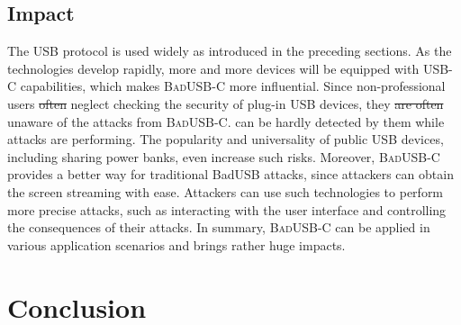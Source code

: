 \documentclass[conference]{IEEEtran}
\newcommand{\tool}{\mbox{\textsc{BadUSB-C}}\xspace}
\newcommand{\outline}[1]{}
\newcommand{\shuqing}[1]{}
\providecommand{\DIFaddtex}[1]{{\protect\color{blue}\uwave{#1}}} %
\providecommand{\DIFdeltex}[1]{{\protect\color{red}\sout{#1}}}                      %
\providecommand{\DIFaddbegin}{} %
\providecommand{\DIFaddend}{} %
\providecommand{\DIFdelbegin}{} %
\providecommand{\DIFdelend}{} %
\providecommand{\DIFadd}[1]{\texorpdfstring{\DIFaddtex{#1}}{#1}} %
\providecommand{\DIFdel}[1]{\texorpdfstring{\DIFdeltex{#1}}{}} %
\newcommand{\DIFscaledelfig}{0.5}
\newlength{\DIFdelgraphicswidth} %
\newlength{\DIFdelgraphicsheight} %
\newcommand{\DIFaddincludegraphics}[2][]{{\color{blue}\fbox{\DIFOincludegraphics[#1]{#2}}}} %
\newcommand{\DIFdelincludegraphics}[2][]{%
\sbox{\DIFdelgraphicsbox}{\DIFOincludegraphics[#1]{#2}}%
\settoboxwidth{\DIFdelgraphicswidth}{\DIFdelgraphicsbox} %
\settoboxtotalheight{\DIFdelgraphicsheight}{\DIFdelgraphicsbox} %
\scalebox{\DIFscaledelfig}{%
\parbox[b]{\DIFdelgraphicswidth}{\usebox{\DIFdelgraphicsbox}\\[-\baselineskip] \rule{\DIFdelgraphicswidth}{0em}}\llap{\resizebox{\DIFdelgraphicswidth}{\DIFdelgraphicsheight}{%
\setlength{\unitlength}{\DIFdelgraphicswidth}%
\begin{picture}(1,1)%
\thicklines\linethickness{2pt} %
{\color[rgb]{1,0,0}\put(0,0){\framebox(1,1){}}}%
{\color[rgb]{1,0,0}\put(0,0){\line( 1,1){1}}}%
{\color[rgb]{1,0,0}\put(0,1){\line(1,-1){1}}}%
\end{picture}%
}\hspace*{3pt}}} %
} %
\DeclareRobustCommand{\DIFaddbegin}{\DIFOaddbegin \let\includegraphics\DIFaddincludegraphics} %
\DeclareRobustCommand{\DIFaddend}{\DIFOaddend \let\includegraphics\DIFOincludegraphics} %
\DeclareRobustCommand{\DIFdelbegin}{\DIFOdelbegin \let\includegraphics\DIFdelincludegraphics} %
\DeclareRobustCommand{\DIFdelend}{\DIFOaddend \let\includegraphics\DIFOincludegraphics} %
\begin{document}

\subsection{Impact}

The \ac{USB} protocol is used widely as introduced in the preceding sections.  As the
technologies develop rapidly, more and more devices will be equipped with USB-C
capabilities\DIFaddbegin \DIFadd{~\mbox{%
\cite{li2018usb}}\hspace{0pt}%
}\DIFaddend , which makes \tool more influential.
Since non-professional users \DIFdelbegin \DIFdel{often }\DIFdelend \DIFaddbegin \DIFadd{may }\DIFaddend neglect checking the security of plug-in \ac{USB} devices,
they \DIFdelbegin \DIFdel{are often }\DIFdelend \DIFaddbegin \DIFadd{may }\DIFaddend unaware of the attacks from \tool.
can be hardly detected by them while attacks are performing.
The popularity and universality of public \ac{USB} devices, including sharing power banks, even
increase such risks.  Moreover, \tool provides a better way for traditional
BadUSB attacks, since attackers can obtain the screen streaming with ease.
Attackers can use such technologies to perform more precise attacks, such as
interacting with the user interface and controlling the consequences of their
attacks.  In summary, \tool can be applied in various application scenarios and
brings rather huge impacts.

\section{Conclusion}
\label{sec:conclusion}
\outline{Conclusion}
\end{document}
